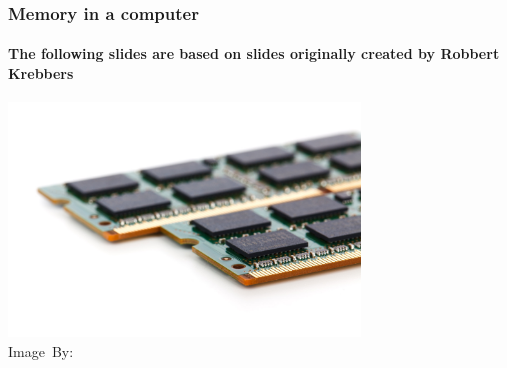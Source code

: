 \begin{frame}
	\frametitle{Memory in a computer}
	\framesubtitle{The following slides are based on slides originally created by Robbert Krebbers}
\begin{center}
	\includegraphics[width=0.70\textwidth]{images/ram.jpg}\\
	\hspace*{15pt}\hbox{\scriptsize Image By:}
\end{center}
\end{frame}




